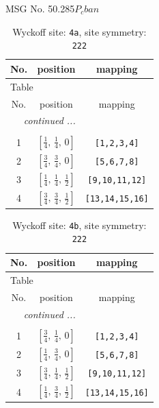 \documentclass[fleqn,8pt]{jsarticle}
\begin{document}
\setcounter{MaxMatrixCols}{32}

\renewcommand{\tablename}{Table~}
\renewcommand{\figurename}{Figure~}
\begin{center}
\LARGE
MSG No. 50.285\quad$P_{c}ban$
\end{center}
\renewcommand{\arraystretch}{1.2}
\begin{longtable}{ccc}
\caption{Wyckoff site: {\tt 4a}, site symmetry: {\tt 222}}
 \\
 \hline \hline
No. & position & mapping \\ \hline \endfirsthead

\multicolumn{2}{l}{\tablename\ \thetable{}} \\
 \hline \hline
No. & position & mapping \\ \hline \endhead

 \hline \hline
\multicolumn{2}{r}{\footnotesize\it continued ...} \\ \endfoot

 \hline \hline
\multicolumn{2}{r}{} \\ \endlastfoot

1 & $\left[ \frac{1}{4},\, \frac{1}{4},\, 0 \right]$ & {\tt [1,2,3,4]} \\ \hline
2 & $\left[ \frac{3}{4},\, \frac{3}{4},\, 0 \right]$ & {\tt [5,6,7,8]} \\ \hline
3 & $\left[ \frac{1}{4},\, \frac{1}{4},\, \frac{1}{2} \right]$ & {\tt [9,10,11,12]} \\ \hline
4 & $\left[ \frac{3}{4},\, \frac{3}{4},\, \frac{1}{2} \right]$ & {\tt [13,14,15,16]} \\
\end{longtable}
\renewcommand{\arraystretch}{1.2}
\begin{longtable}{ccc}
\caption{Wyckoff site: {\tt 4b}, site symmetry: {\tt 222}}
 \\
 \hline \hline
No. & position & mapping \\ \hline \endfirsthead

\multicolumn{2}{l}{\tablename\ \thetable{}} \\
 \hline \hline
No. & position & mapping \\ \hline \endhead

 \hline \hline
\multicolumn{2}{r}{\footnotesize\it continued ...} \\ \endfoot

 \hline \hline
\multicolumn{2}{r}{} \\ \endlastfoot

1 & $\left[ \frac{3}{4},\, \frac{1}{4},\, 0 \right]$ & {\tt [1,2,3,4]} \\ \hline
2 & $\left[ \frac{1}{4},\, \frac{3}{4},\, 0 \right]$ & {\tt [5,6,7,8]} \\ \hline
3 & $\left[ \frac{3}{4},\, \frac{1}{4},\, \frac{1}{2} \right]$ & {\tt [9,10,11,12]} \\ \hline
4 & $\left[ \frac{1}{4},\, \frac{3}{4},\, \frac{1}{2} \right]$ & {\tt [13,14,15,16]} \\
\end{longtable}
\end{document}

